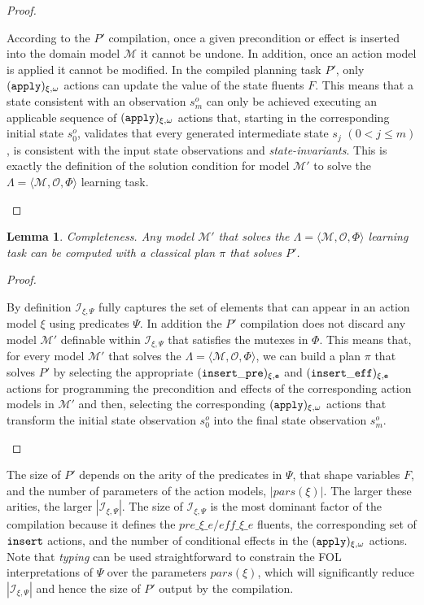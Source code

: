 \documentclass{article}
\newcommand{\tup}[1]{{\langle #1 \rangle}}
\newtheorem{mylemma}[mytheorem]{Lemma}
\begin{document}
\begin{proof}[Proof]
\begin{small}
According to the $P'$ compilation, once a given precondition or effect is inserted into the domain model $\mathcal{M}$ it cannot be undone. In addition, once an action model is applied it cannot be modified. In the compiled planning task $P'$, only ${\tt \small (apply)_{\xi,\omega}}$ actions can update the value of the state fluents $F$. This means that a state consistent with an observation $s_m^o$ can only be achieved executing an applicable sequence of ${\tt \small (apply)_{\xi,\omega}}$ actions that, starting in the corresponding initial state $s_0^o$, validates that every generated intermediate state $s_j$ $(0 < j\leq m)$, is consistent with the input state observations and {\em state-invariants}. This is exactly the definition of the solution condition for model $\mathcal{M}'$ to solve the $\Lambda=\tup{\mathcal{M},{\mathcal O},\Phi}$ learning task.
\end{small}
\end{proof}

\begin{mylemma}
Completeness. Any model $\mathcal{M}'$ that solves the $\Lambda=\tup{\mathcal{M},{\mathcal O},\Phi}$ learning task can be computed with a classical plan $\pi$ that solves $P'$.
\end{mylemma}

\begin{proof}[Proof]
\begin{small}
By definition ${\mathcal I}_{\xi,\Psi}$ fully captures the set of elements that can appear in an action model $\xi$ using predicates $\Psi$. In addition the $P'$ compilation does not discard any model $\mathcal{M}'$ definable within ${\mathcal I}_{\xi,\Psi}$ that satisfies the mutexes in $\Phi$. This means that, for every model $\mathcal{M}'$ that solves the $\Lambda=\tup{\mathcal{M},{\mathcal O},\Phi}$, we can build a plan $\pi$ that solves $P'$ by selecting the appropriate ${\tt \small (insert\_pre)_{\xi,e}}$ and ${\tt \small (insert\_eff)_{\xi,e}}$ actions for programming the precondition and effects of the corresponding action models in $\mathcal{M}'$ and then, selecting the corresponding ${\tt \small (apply)_{\xi,\omega}}$ actions that transform the initial state observation $s_0^o$ into the final state observation $s_m^o$.
\end{small}
\end{proof}

The size of $P'$ depends on the arity of the predicates in $\Psi$, that shape variables $F$, and the number of parameters of the action models, $|pars(\xi)|$. The larger these arities, the larger $|{\mathcal I}_{\xi,\Psi}|$. The size of ${\mathcal I}_{\xi,\Psi}$ is the most dominant factor of the compilation because it defines the $pre\_\xi\_e/eff\_\xi\_e$ fluents, the corresponding set of ${\tt \small insert}$ actions, and the number of conditional effects in the ${\tt \small (apply)_{\xi,\omega}}$ actions. Note that {\em typing} can be used straightforward to constrain the FOL interpretations of $\Psi$ over the parameters $pars(\xi)$, which will significantly reduce $|{\mathcal I}_{\xi,\Psi}|$ and hence the size of $P'$ output by the compilation.
\end{document}
